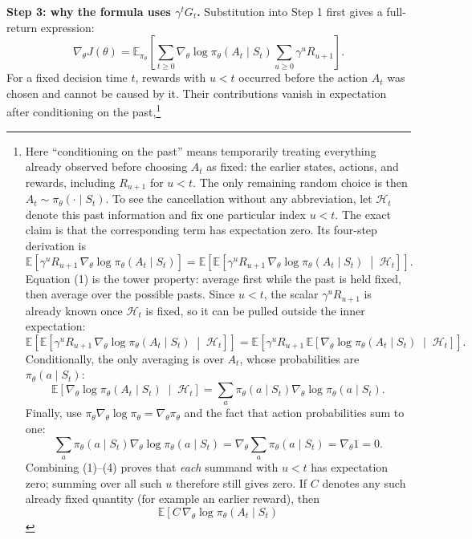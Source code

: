 \documentclass[11pt,a4paper]{article}
\theoremstyle{definition}
\begin{document}
\begin{note}
\medskip\noindent\textbf{Step 3: why the formula uses \(\gamma^tG_t\).}
Substitution into Step 1 first gives a full-return expression:
\[
\nabla_\theta J(\theta)
=\mathbb{E}_{\pi_\theta}\left[
\sum_{t\geq0}
\nabla_\theta\log\pi_\theta(A_t\mid S_t)
\sum_{u\geq0}\gamma^uR_{u+1}
\right].
\]
For a fixed decision time $t$, rewards with $u<t$ occurred before the action $A_t$ was
chosen and cannot be caused by it. Their contributions vanish in expectation after conditioning
on the past,\footnote{Here ``conditioning on the past'' means temporarily treating everything
already observed before choosing $A_t$ as fixed: the earlier states, actions, and rewards,
including $R_{u+1}$ for $u<t$. The only remaining random choice is then
$A_t\sim\pi_\theta(\cdot\mid S_t)$. To see the cancellation without any abbreviation, let
$\mathcal{H}_t$ denote this past information and fix one particular index $u<t$. The exact
claim is that the corresponding term has expectation zero. Its four-step derivation is
\[
\mathbb{E}\!\left[
\gamma^uR_{u+1}\,
\nabla_\theta\log\pi_\theta(A_t\mid S_t)
\right]
=\mathbb{E}\!\left[
\mathbb{E}\!\left[
\gamma^uR_{u+1}\,
\nabla_\theta\log\pi_\theta(A_t\mid S_t)
\;\middle|\;\mathcal{H}_t
\right]\right].
\tag{1}
\]
Equation (1) is the tower property: average first while the past is held fixed, then average
over the possible pasts. Since $u<t$, the scalar $\gamma^uR_{u+1}$ is already known once
$\mathcal{H}_t$ is fixed, so it can be pulled outside the inner expectation:
\[
\mathbb{E}\!\left[
\mathbb{E}\!\left[
\gamma^uR_{u+1}\,
\nabla_\theta\log\pi_\theta(A_t\mid S_t)
\;\middle|\;\mathcal{H}_t
\right]\right]
=\mathbb{E}\!\left[
\gamma^uR_{u+1}\,
\mathbb{E}\!\left[
\nabla_\theta\log\pi_\theta(A_t\mid S_t)
\;\middle|\;\mathcal{H}_t
\right]\right].
\tag{2}
\]
Conditionally, the only averaging is over $A_t$, whose probabilities are
$\pi_\theta(a\mid S_t)$:
\[
\mathbb{E}\!\left[
\nabla_\theta\log\pi_\theta(A_t\mid S_t)
\;\middle|\;\mathcal{H}_t
\right]
=\sum_a\pi_\theta(a\mid S_t)
\nabla_\theta\log\pi_\theta(a\mid S_t).
\tag{3}
\]
Finally, use $\pi_\theta\nabla_\theta\log\pi_\theta=\nabla_\theta\pi_\theta$ and
the fact that action probabilities sum to one:
\[
\sum_a\pi_\theta(a\mid S_t)
\nabla_\theta\log\pi_\theta(a\mid S_t)
=\nabla_\theta\sum_a\pi_\theta(a\mid S_t)
=\nabla_\theta 1
=0.
\tag{4}
\]
Combining (1)--(4) proves that \emph{each} summand with $u<t$ has expectation zero; summing
over all such $u$ therefore still gives zero. If $C$ denotes any such already fixed quantity (for
example an earlier reward), then
\[
\mathbb{E}\!\left[
C\,\nabla_\theta\log\pi_\theta(A_t\mid S_t)
\]}
\end{note}
\end{document}
